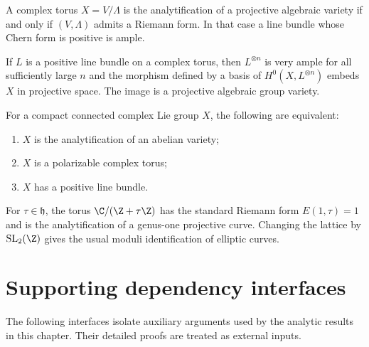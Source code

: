 \begin{theorem}
\label{mumford-thm-riemann-algebraizability}
A complex torus $X=V/\Lambda$ is the analytification of a projective algebraic
variety if and only if $(V,\Lambda)$ admits a Riemann form.  In that case a
line bundle whose Chern form is positive is ample.
\notready
\end{theorem}

\begin{theorem}
\label{mumford-thm-theta-embedding}
If $L$ is a positive line bundle on a complex torus, then $L^{\otimes n}$ is
very ample for all sufficiently large $n$ and the morphism defined by a basis
of $H^0(X,L^{\otimes n})$ embeds $X$ in projective space.  The image is a
projective algebraic group variety.
\notready
\end{theorem}

\begin{corollary}
\label{mumford-cor-complex-av-torus}
For a compact connected complex Lie group $X$, the following are equivalent:
\begin{enumerate}
\item $X$ is the analytification of an abelian variety;
\item $X$ is a polarizable complex torus;
\item $X$ has a positive line bundle.
\end{enumerate}
\notready
\end{corollary}

\begin{example}
\label{mumford-ex-complex-elliptic}
For $\tau\in\mathfrak h$, the torus $\C/(\Z+\tau\Z)$ has the standard Riemann
form $E(1,\tau)=1$ and is the analytification of a genus-one projective curve.
Changing the lattice by $\operatorname{SL}_2(\Z)$ gives the usual moduli
identification of elliptic curves.
\notready
\end{example}

\section{Supporting dependency interfaces}
\label{mumford-I-coverage-register}
The following interfaces isolate auxiliary arguments used by the analytic
results in this chapter.  Their detailed proofs are treated as external inputs.

